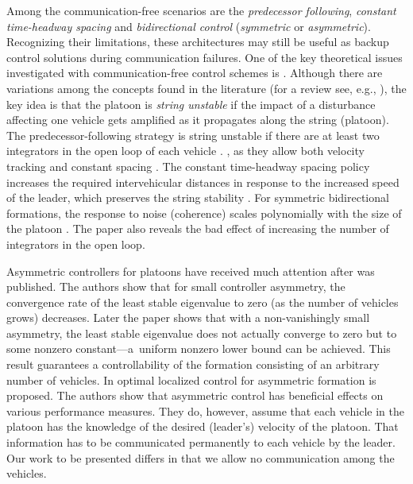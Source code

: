 \documentclass[technote, 10pt, twoside]{IEEEtran}
\theoremstyle{plain}
\theoremstyle{definition}
\theoremstyle{assump}
\begin{document}
Among the communication-free scenarios are the \textit{predecessor following},
\textit{constant time-headway spacing} and \textit{bidirectional control}
(\textit{symmetric} or \textit{asymmetric}). Recognizing their limitations,
these architectures may still be useful as backup control solutions during
communication failures. One of the key theoretical issues investigated with
communication-free control schemes is . Although there are variations among the concepts found in
the literature (for a review see, e.g., \cite{Ploeg2014}), the key idea is that
the platoon is \textit{string unstable} if the impact of a disturbance affecting one vehicle gets amplified as it
propagates along the string (platoon). The predecessor-following strategy is
string unstable if there are at least two integrators in the open loop of each
vehicle \cite{Seiler2004a}. , as they allow both
velocity tracking and constant spacing \cite{Barooah2005}. The constant
time-headway spacing policy increases the required intervehicular distances in
response to the increased speed of the leader, which preserves the string
stability \cite{Middleton2010}. For symmetric bidirectional formations, the
response to noise (coherence) scales polynomially with the size of the platoon
\cite{Bamieh2012}. The paper also reveals the bad effect of increasing the number of integrators in the open loop.
 
Asymmetric controllers for platoons have received much attention after
\cite{Barooah2009a} was published. The authors show that for small controller
asymmetry,
the convergence rate of the least stable eigenvalue to zero
(as the number of vehicles grows) decreases. 
Later the paper \cite{Hao2012} shows that with a non-vanishingly small
asymmetry, the least stable eigenvalue does not actually converge to zero but to
some nonzero constant---a~uniform nonzero lower bound can be achieved.
This result guarantees a
controllability of the formation consisting of an arbitrary number of vehicles.
In \cite{Lin2012} optimal localized control for asymmetric formation is
proposed. The authors show that asymmetric control has beneficial effects on
various performance measures. They do, however, assume that each vehicle in the
platoon has the knowledge of the desired (leader's) velocity of the platoon.
That information has to be communicated permanently to each vehicle by the
leader.
Our work to be presented differs in that we allow no communication among the vehicles.
\end{document}

